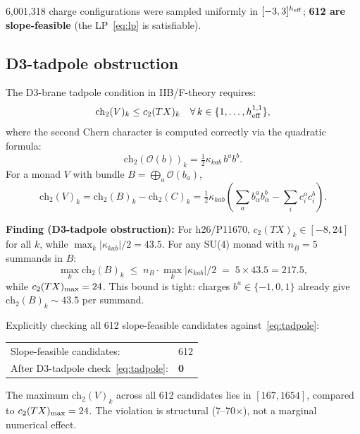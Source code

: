 \documentclass[11pt,a4paper]{article}
\newcommand{\hone}{h^{1,1}}
\newcommand{\cO}{\mathcal{O}}
\newcommand{\ch}{\mathrm{ch}}
\begin{document}
6,001,318 charge configurations were sampled
uniformly in $[-3,3]^{h_{\rm eff}}$;
\textbf{612 are slope-feasible} (the LP~\eqref{eq:lp} is satisfiable).

\subsection{D3-tadpole obstruction}
\label{sec:tadpole}

The D3-brane tadpole condition in IIB/F-theory requires:
\begin{equation}
  \ch_2(V)_k \leq c_2(TX)_k \quad \forall\, k \in \{1,\ldots,\hone_{\rm eff}\},
  \label{eq:tadpole}
\end{equation}
where the second Chern character is computed correctly via
the quadratic formula:
\begin{equation}
  \ch_2(\cO(b))_k = \tfrac{1}{2}\kappa_{kab}\,b^a b^b.
  \label{eq:ch2}
\end{equation}
For a monad $V$ with bundle $B = \bigoplus_a \cO(b_a)$,
\begin{equation}
  \ch_2(V)_k = \ch_2(B)_k - \ch_2(C)_k
    = \tfrac{1}{2}\kappa_{kab}
      \!\left(\sum_a b^a_\alpha b^b_\alpha
             -\sum_i c^a_i c^b_i\right).
  \label{eq:ch2_monad}
\end{equation}

\noindent\textbf{Finding (D3-tadpole obstruction):}
For h26/P11670, $c_2(TX)_k \in [-8, 24]$ for all $k$,
while $\max_k |\kappa_{kab}|/2 = 43.5$.
For any SU(4) monad with $n_B = 5$ summands in $B$:
\begin{equation}
  \max_k \ch_2(B)_k \;\leq\; n_B \cdot \max_k|\kappa_{kab}|/2
  \;=\; 5 \times 43.5 = 217.5,
\end{equation}
while $c_2(TX)_{\rm max} = 24$.
This bound is tight: charges $b^a \in \{-1,0,1\}$ already give
$\ch_2(B)_k \sim 43.5$ per summand.

Explicitly checking all 612 slope-feasible candidates against~\eqref{eq:tadpole}:

\begin{center}
\begin{tabular}{ll}
Slope-feasible candidates: & 612 \\
After D3-tadpole check~\eqref{eq:tadpole}: & \textbf{0} \\
\end{tabular}
\end{center}

\noindent
The maximum $\ch_2(V)_k$ across all 612 candidates lies in
$[167, 1654]$, compared to $c_2(TX)_{\rm max} = 24$.
The violation is structural (7--70$\times$), not a marginal
numerical effect.
\end{document}
